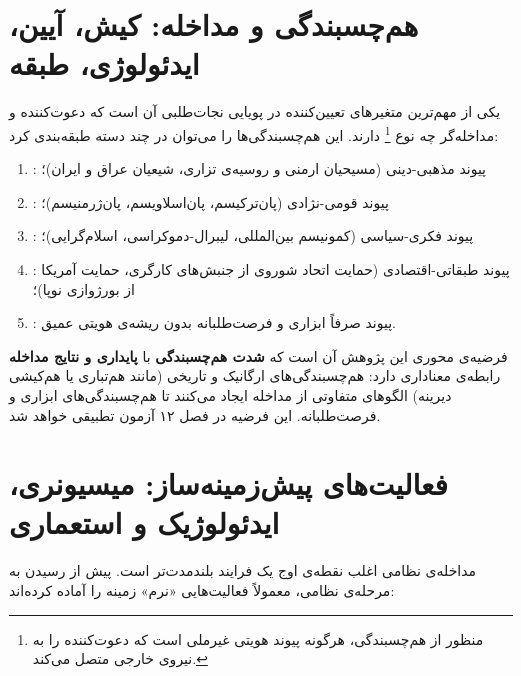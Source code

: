 \section{هم‌چسبندگی و مداخله: کیش، آیین، ایدئولوژی، طبقه}
\label{sec:ch01-adhesion}

یکی از مهم‌ترین متغیرهای تعیین‌کننده در پویایی نجات‌طلبی آن است که
دعوت‌کننده و مداخله‌گر چه نوع %
\footnote{منظور از هم‌چسبندگی، هرگونه پیوند هویتی غیرملی است که
  دعوت‌کننده را به نیروی خارجی متصل می‌کند.}
دارند. این هم‌چسبندگی‌ها را می‌توان در چند دسته طبقه‌بندی کرد:

\begin{enumerate}[label=\textbf{\alph*.}, nosep, rightmargin=1em]
  \item {}: پیوند مذهبی-دینی (مسیحیان ارمنی و روسیه‌ی
    تزاری، شیعیان عراق و ایران)؛
  \item {}: پیوند قومی-نژادی (پان‌ترکیسم، پان‌اسلاویسم،
    پان‌ژرمنیسم)؛
  \item {}: پیوند فکری-سیاسی (کمونیسم بین‌المللی،
    لیبرال-دموکراسی، اسلام‌گرایی)؛
  \item {}: پیوند طبقاتی-اقتصادی (حمایت اتحاد شوروی
    از جنبش‌های کارگری، حمایت آمریکا از بورژوازی نوپا)؛
  \item {}: پیوند صرفاً ابزاری و فرصت‌طلبانه بدون
    ریشه‌ی هویتی عمیق.
\end{enumerate}

\begin{tcolorbox}[wavebox, title={\rl{نکته‌ی تحلیلی}}]
فرضیه‌ی محوری این پژوهش آن است که \textbf{شدت هم‌چسبندگی} با
\textbf{پایداری و نتایج مداخله} رابطه‌ی معناداری دارد: هم‌چسبندگی‌های
ارگانیک و تاریخی (مانند هم‌تباری یا هم‌کیشی دیرینه) الگوهای متفاوتی
از مداخله ایجاد می‌کنند تا هم‌چسبندگی‌های ابزاری و فرصت‌طلبانه.
این فرضیه در فصل ۱۲ آزمون تطبیقی خواهد شد.
\end{tcolorbox}


\section{فعالیت‌های پیش‌زمینه‌ساز: میسیونری، ایدئولوژیک و استعماری}
\label{sec:ch01-precursors}

مداخله‌ی نظامی اغلب نقطه‌ی اوج یک فرایند بلندمدت‌تر است. پیش از رسیدن
به مرحله‌ی نظامی، معمولاً فعالیت‌هایی «نرم» زمینه را آماده کرده‌اند:

